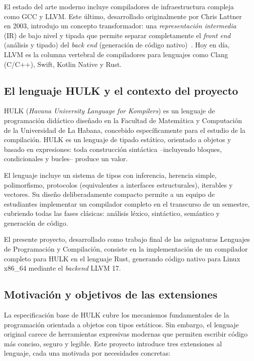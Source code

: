 \documentclass[12pt, a4paper]{article}
\begin{document}
El estado del arte moderno incluye compiladores de infraestructura compleja como
GCC y LLVM. Este último, desarrollado originalmente por Chris Lattner en 2003,
introdujo un concepto transformador: una \textit{representación intermedia} (IR)
de bajo nivel y tipada que permite separar completamente el \textit{front end}
(análisis y tipado) del \textit{back end} (generación de código nativo)~\cite{lattner2004}. Hoy en
día, LLVM es la columna vertebral de compiladores para lenguajes como Clang
(C/C++), Swift, Kotlin Native y Rust.

\subsection{El lenguaje HULK y el contexto del proyecto}

HULK (\textit{Havana University Language for Kompilers}) es un lenguaje de
programación didáctico diseñado en la Facultad de Matemática y Computación de la
Universidad de La Habana, concebido específicamente para el estudio de la
compilación. HULK es un lenguaje de tipado estático, orientado a objetos y basado
en expresiones: toda construcción sintáctica --incluyendo bloques, condicionales y
bucles-- produce un valor.

El lenguaje incluye un sistema de tipos con inferencia, herencia simple,
polimorfismo, protocolos (equivalentes a interfaces estructurales), iterables y
vectores. Su diseño deliberadamente compacto permite a un equipo de estudiantes
implementar un compilador completo en el transcurso de un semestre, cubriendo
todas las fases clásicas: análisis léxico, sintáctico, semántico y generación de
código.

El presente proyecto, desarrollado como trabajo final de las asignaturas
Lenguajes de Programación y Compilación, consiste en la implementación de un
compilador completo para HULK en el lenguaje Rust, generando código nativo para
Linux x86\_64 mediante el \textit{backend} LLVM 17.

\subsection{Motivación y objetivos de las extensiones}

La especificación base de HULK cubre los mecanismos fundamentales de la
programación orientada a objetos con tipos estáticos. Sin embargo, el lenguaje
original carece de herramientas expresivas modernas que permiten escribir código
más conciso, seguro y legible. Este proyecto introduce tres extensiones al
lenguaje, cada una motivada por necesidades concretas:
\end{document}
